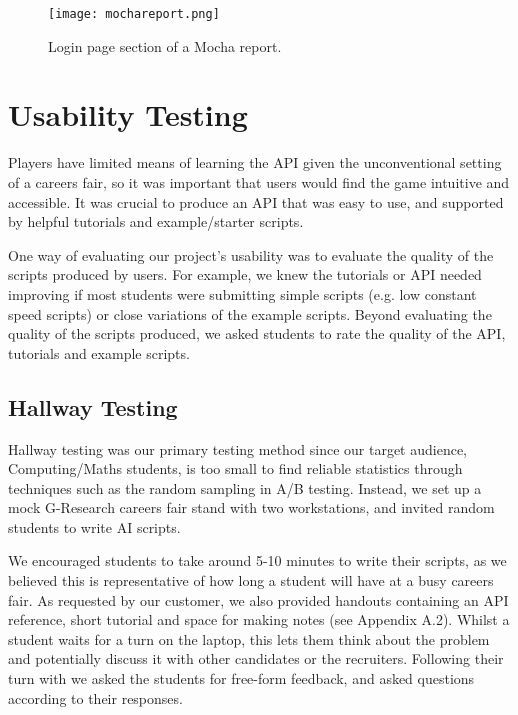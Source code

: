 \begin{figure}[H]
\centering
\texttt{[image: mochareport.png]}
\caption{Login page section of a Mocha report.}
\end{figure}

\section{Usability Testing}

Players have limited means of learning the API given the unconventional setting of a careers fair, so it was important that users would find the game intuitive and accessible. It was crucial to produce an API that was easy to use, and supported by helpful tutorials and example/starter scripts. 

One way of evaluating our project's usability was to evaluate the quality of the scripts produced by users. For example, we knew the tutorials or API needed improving if most students were submitting simple scripts (e.g. low constant speed scripts) or close variations of the example scripts. Beyond evaluating the quality of the scripts produced, we asked students to rate the quality of the API, tutorials and example scripts.

\subsection{Hallway Testing}

Hallway testing was our primary testing method since our target audience, Computing/Maths students, is too small to find reliable statistics through techniques such as the random sampling in A/B testing. Instead, we set up a mock G-Research careers fair stand with two workstations, and invited random students to write AI scripts.

We encouraged students to take around 5-10 minutes to write their scripts, as we believed this is representative of how long a student will have at a busy careers fair. As requested by our customer, we also provided handouts containing an API reference, short tutorial and space for making notes (see Appendix A.2). Whilst a student waits for a turn on the laptop, this lets them think about the problem and potentially discuss it with other candidates or the recruiters. Following their turn with \project we asked the students for free-form feedback, and asked questions according to their responses.


